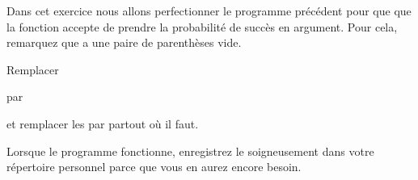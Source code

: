 
\begin{exercice}\label{exoPremiere-0079}

    Dans cet exercice nous allons perfectionner le programme précédent pour que que la fonction accepte de prendre la probabilité de succès en argument. Pour cela, remarquez que  a une paire de parenthèses vide.

    Remplacer
    \begin{quote}
    \end{quote}
    par
    \begin{quote}
    \end{quote}
    et remplacer les  par  partout où il faut.

    Lorsque le programme fonctionne, enregistrez le soigneusement dans votre répertoire personnel parce que vous en aurez encore besoin.

\end{exercice}
